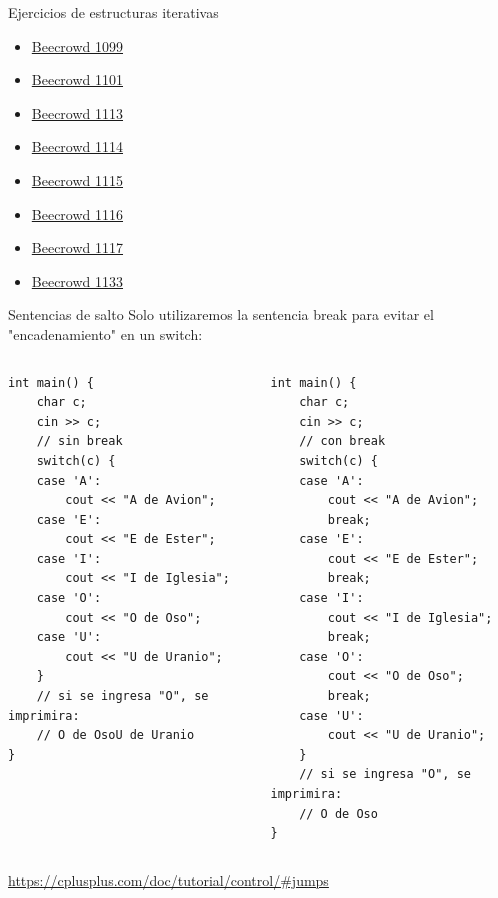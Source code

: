 \documentclass[12pt]{beamer}
\begin{document}
\begin{frame}{Ejercicios de estructuras iterativas}
\begin{multicols}{3}
\begin{itemize}
            \item \href{https://judge.beecrowd.com/es/problems/view/1099}{Beecrowd 1099}
            \item \href{https://judge.beecrowd.com/es/problems/view/1101}{Beecrowd 1101}
            \item \href{https://judge.beecrowd.com/es/problems/view/1113}{Beecrowd 1113}
            \item \href{https://judge.beecrowd.com/es/problems/view/1114}{Beecrowd 1114}
            \item \href{https://judge.beecrowd.com/es/problems/view/1115}{Beecrowd 1115}
            \item \href{https://judge.beecrowd.com/es/problems/view/1116}{Beecrowd 1116}
            \item \href{https://judge.beecrowd.com/es/problems/view/1117}{Beecrowd 1117}
            \item \href{https://judge.beecrowd.com/es/problems/view/1133}{Beecrowd 1133}
        \end{itemize}
    \end{multicols}
\end{frame}

\begin{frame}[fragile]{Sentencias de salto}
    \footnotesize Solo utilizaremos la sentencia \alert{break} para evitar el "encadenamiento" en un switch: \\
    \begin{columns}
        \begin{lstlisting}[basicstyle=\tiny]
int main() {
    char c;
    cin >> c;
    // sin break
    switch(c) {
    case 'A': 
        cout << "A de Avion";
    case 'E':
        cout << "E de Ester";
    case 'I':
        cout << "I de Iglesia";
    case 'O':
        cout << "O de Oso";
    case 'U':
        cout << "U de Uranio";
    }
    // si se ingresa "O", se imprimira:
    // O de OsoU de Uranio
}
\end{lstlisting}
        \begin{lstlisting}[basicstyle=\tiny]
int main() {
    char c;
    cin >> c;
    // con break
    switch(c) {
    case 'A': 
        cout << "A de Avion";
        break;
    case 'E':
        cout << "E de Ester";
        break;
    case 'I':
        cout << "I de Iglesia";
        break;
    case 'O':
        cout << "O de Oso";
        break;
    case 'U':
        cout << "U de Uranio";
    }
    // si se ingresa "O", se imprimira:
    // O de Oso
}
\end{lstlisting}    
    \end{columns}
    \begin{center}
        \scriptsize\url{https://cplusplus.com/doc/tutorial/control/#jumps}
    \end{center}
\end{frame}
\end{document}
